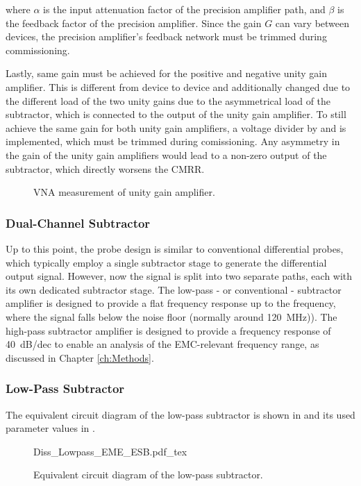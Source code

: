 where $\alpha$ is the input attenuation factor of the precision amplifier path, and $\beta$ is the feedback factor of the precision amplifier.
Since the gain $G$ can vary between devices, the precision amplifier's feedback network must be trimmed during commissioning.

Lastly, same gain must be achieved for the positive and negative unity gain amplifier.
This is different from device to device and additionally changed due to the different load of the two unity gains due to the asymmetrical load of the subtractor, which is connected to the output of the unity gain amplifier.
To still achieve the same gain for both unity gain amplifiers, a voltage divider by  and  is implemented, which must be trimmed during comissioning.
Any asymmetry in the gain of the unity gain amplifiers would lead to a non-zero output of the subtractor, which directly worsens the CMRR.


\begin{figure}[ht]
	\centering
	
	\caption{VNA measurement of unity gain amplifier.}\label{fig:VNA_rawUG}
\end{figure}

\subsubsection*{Dual-Channel Subtractor}
Up to this point, the probe design is similar to conventional differential probes, which typically employ a single subtractor stage to generate the differential output signal.
However, now the signal is split into two separate paths, each with its own dedicated subtractor stage.
The low-pass - or conventional - subtractor amplifier is designed to provide a flat frequency response up to the frequency, where the signal falls below the noise floor (normally around \SI{120}{MHz})).
The high-pass subtractor amplifier is designed to provide a frequency response of \SI{+40}{dB/dec} to enable an analysis of the EMC-relevant frequency range, as discussed in Chapter \ref{ch:Methods}.

\subsubsection*{Low-Pass Subtractor}
The equivalent circuit diagram of the low-pass subtractor is shown in  and its used parameter values in .

\begin{figure}[ht]
	\centering
	{Diss_Lowpass_EME_ESB.pdf_tex}
	\caption{Equivalent circuit diagram of the low-pass subtractor.}\label{fig:EME_ESB_LP}
\end{figure}


